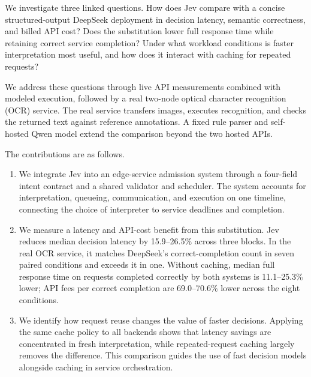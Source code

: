 We investigate three linked questions. How does Jev compare with a concise
structured-output DeepSeek deployment in decision latency, semantic
correctness, and billed API cost? Does the substitution lower full response
time while retaining correct service completion? Under what workload
conditions is faster interpretation most useful, and how does it interact
with caching for repeated requests?

We address these questions through live API measurements combined with
modeled execution, followed by a real two-node optical character recognition
(OCR) service. The real service transfers images, executes recognition, and
checks the returned text against reference annotations. A fixed rule parser
and self-hosted Qwen model extend the comparison beyond the two hosted APIs.

The contributions are as follows.
\begin{enumerate}
\item We integrate Jev into an edge-service admission system through a
four-field intent contract and a shared validator and scheduler. The system
accounts for interpretation, queueing, communication, and execution on one
timeline, connecting the choice of interpreter to service deadlines and
completion.
\item We measure a latency and API-cost benefit from this substitution.
Jev reduces median decision latency by 15.9--26.5\% across three blocks.
In the real OCR service, it matches DeepSeek's correct-completion count in
seven paired conditions and exceeds it in one. Without caching, median
full response time on requests completed correctly by both systems is
11.1--25.3\% lower; API fees per correct completion are 69.0--70.6\% lower
across the eight conditions.
\item We identify how request reuse changes the value of faster decisions.
Applying the same cache policy to all backends shows that latency savings
are concentrated in fresh interpretation, while repeated-request caching
largely removes the difference. This comparison guides the use of fast
decision models alongside caching in service orchestration.
\end{enumerate}
